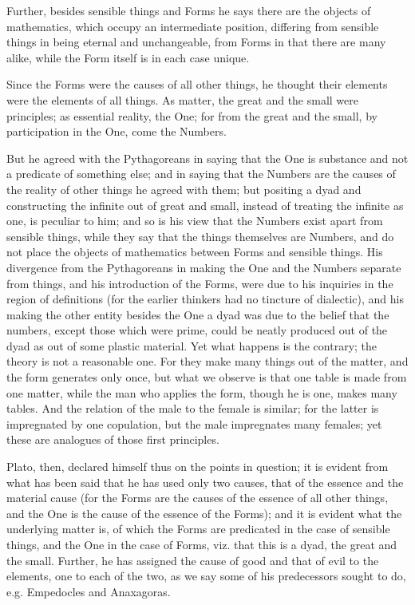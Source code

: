 \documentclass[oneside, 17pt, dvipsnames]{extbook}
\begin{document}
Further, besides sensible things and Forms he says there are the objects of mathematics, which occupy an intermediate position, differing from sensible things in being eternal and unchangeable, from Forms in that there are many alike, while the Form itself is in each case unique.

Since the Forms were the causes of all other things, he thought their elements were the elements of all things. As matter, the great and the small were principles; as essential reality, the One; for from the great and the small, by participation in the One, come the Numbers.

But he agreed with the Pythagoreans in saying that the One is substance and not a predicate of something else; and in saying that the Numbers are the causes of the reality of other things he agreed with them; but positing a dyad and constructing the infinite out of great and small, instead of treating the infinite as one, is peculiar to him; and so is his view that the Numbers exist apart from sensible things, while they say that the things themselves are Numbers, and do not place the objects of mathematics between Forms and sensible things. His divergence from the Pythagoreans in making the One and the Numbers separate from things, and his introduction of the Forms, were due to his inquiries in the region of definitions (for the earlier thinkers had no tincture of dialectic), and his making the other entity besides the One a dyad was due to the belief that the numbers, except those which were prime, could be neatly produced out of the dyad as out of some plastic material. Yet what happens is the contrary; the theory is not a reasonable one. For they make many things out of the matter, and the form generates only once, but what we observe is that one table is made from one matter, while the man who applies the form, though he is one, makes many tables. And the relation of the male to the female is similar; for the latter is impregnated by one copulation, but the male impregnates many females; yet these are analogues of those first principles.

Plato, then, declared himself thus on the points in question; it is evident from what has been said that he has used only two causes, that of the essence and the material cause (for the Forms are the causes of the essence of all other things, and the One is the cause of the essence of the Forms); and it is evident what the underlying matter is, of which the Forms are predicated in the case of sensible things, and the One in the case of Forms, viz. that this is a dyad, the great and the small. Further, he has assigned the cause of good and that of evil to the elements, one to each of the two, as we say some of his predecessors sought to do, e.g. Empedocles and Anaxagoras.
\end{document}

